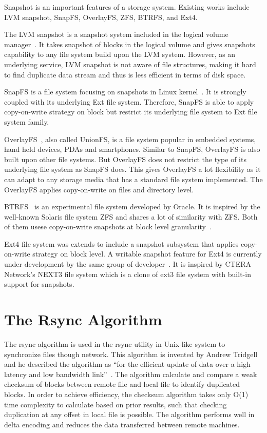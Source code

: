     Snapshot is an important features of a storage system. Existing works include LVM snapshot, SnapFS, OverlayFS, ZFS, BTRFS, and Ext4.
    
    The LVM snapshot is a snapshot system included in the logical volume manager~\cite{lvm, disk_perform_lvm}. It takes snapshot of blocks in the logical volume and gives snapshots capability to any file system build upon the LVM system. However, as an underlying service, LVM snapshot is not aware of file structures, making it hard to find duplicate data stream and thus is less efficient in terms of disk space.
    
    SnapFS is a file system focusing on snapshots in Linux kernel~\cite{snapfs}. It is strongly coupled with its underlying Ext file system. Therefore, SnapFS is able to apply copy-on-write strategy on block but restrict its underlying file system to Ext file system family. 
    
    OverlayFS~\cite{overlayfs}, also called UnionFS, is a file system popular in embedded systems, hand held devices, PDAs and smartphones. Similar to SnapFS, OverlayFS is also built upon other file systems. But OverlayFS does not restrict the type of its underlying file system as SnapFS does. This gives OverlayFS a lot flexibility as it can adapt to any storage media that has a standard file system implemented. The OverlayFS applies copy-on-write on files and directory level.

    BTRFS~\cite{btrfs} is an experimental file system developed by Oracle. It is inspired by the well-known Solaris file system ZFS and shares a lot of similarity with ZFS. Both of them usese copy-on-write snapshots at block level granularity~\cite{btrfscow}.
    
    Ext4 file system was extends to include a snapshot subsystem that applies copy-on-write strategy on block level. A writable snapshot feature for Ext4 is currently under development by the same group of developer~\cite{ext4snap}. It is inspired by CTERA Network's NEXT3 file system which is a clone of ext3 file system with built-in support for snapshots.

\section{The Rsync Algorithm}
    
    The rsync algorithm is used in the rsync utility in Unix-like system to synchronize files though network. This algorithm is invented by Andrew Tridgell and he described the algorithm as ``for the efficient update of data over a high latency and low bandwidth link''~\cite{rsync_alg}. The algorithm calculate and compare a weak checksum of blocks between remote file and local file to identify duplicated blocks. In order to achieve efficiency, the checksum algorithm takes only O(1) time complexity to calculate based on prior results, such that checking duplication at any offset in local file is possible. The algorithm performs well in delta encoding and reduces the data transferred between remote machines.

